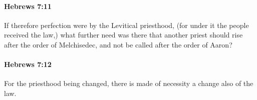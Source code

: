 		\paragraph{Hebrews 7:11} %
			\label{HEBREWS-7-11}

			If therefore perfection were by the Levitical priesthood, (for under it the people received the law,) what further need was there that another priest should rise after the order of Melchisedec, and not be called after the order of Aaron?

			\begin{framed}
			\scriptsize
				\begin{compactdesc}
					\item[SBLG]  \hyperref[TELEIOSIS]{} 
				\end{compactdesc}
			\end{framed}

		\paragraph{Hebrews 7:12} %
			\label{HEBREWS-7-12}

			For the priesthood being changed, there is made of necessity a change also of the law.

